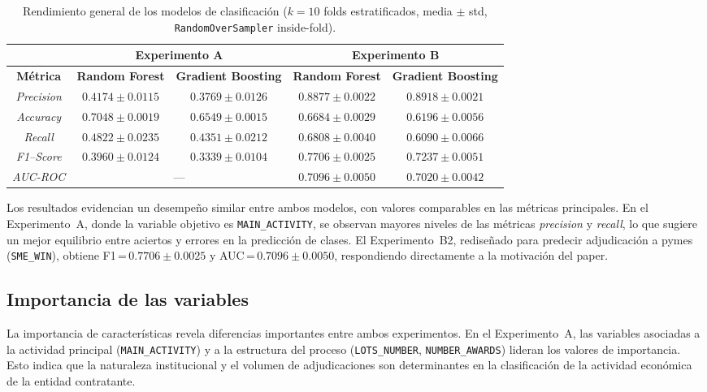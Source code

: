 \documentclass[a4paper,fleqn]{cas-sc}
\begin{document}
 \begin{table}[htb]
 	\small
 	\centering
 	\caption{Rendimiento general de los modelos de clasificación ($k=10$ folds estratificados, media $\pm$ std, \texttt{RandomOverSampler} inside-fold).}
 	\label{tab:metricas_ga_gb} 	
 	\setlength{\tabcolsep}{7pt} 	
	\renewcommand{\arraystretch}{1.3} %
 	\begin{tabular}{ccccc}
 		\hline
 		& \multicolumn{2}{c}{\textbf{Experimento A}} & \multicolumn{2}{c}{\textbf{Experimento B}} \\ \hline
 		\textbf{Métrica} & \textbf{Random Forest} & \textbf{Gradient Boosting} & \textbf{Random Forest} & \textbf{Gradient Boosting} \\ \hline
 		\textit{Precision} & $0.4174 \pm 0.0115$ & $0.3769 \pm 0.0126$ & $0.8877 \pm 0.0022$ & $0.8918 \pm 0.0021$ \\
\textit{Accuracy}  & $0.7048 \pm 0.0019$ & $0.6549 \pm 0.0015$ & $0.6684 \pm 0.0029$ & $0.6196 \pm 0.0056$ \\
\textit{Recall}    & $0.4822 \pm 0.0235$ & $0.4351 \pm 0.0212$ & $0.6808 \pm 0.0040$ & $0.6090 \pm 0.0066$ \\
\textit{F1--Score} & $0.3960 \pm 0.0124$ & $0.3339 \pm 0.0104$ & $0.7706 \pm 0.0025$ & $0.7237 \pm 0.0051$ \\
\textit{AUC-ROC}   & \multicolumn{2}{c}{---} & $0.7096 \pm 0.0050$ & $0.7020 \pm 0.0042$ \\ \hline
 	\end{tabular}
 \end{table}
 
 	Los resultados evidencian un desempeño similar entre ambos modelos, con valores comparables en las métricas principales. 
 	En el Experimento~A, donde la variable objetivo es \linebreak\texttt{MAIN\_ACTIVITY},  se observan mayores niveles de las métricas \textit{precision} y \textit{recall}, lo que sugiere un mejor equilibrio entre aciertos y errores en la predicción de clases. 
 	El Experimento~B2, rediseñado para predecir adjudicación a pymes (\texttt{SME\_WIN}), obtiene F1\,=\,$0.7706 \pm 0.0025$ y AUC\,=\,$0.7096 \pm 0.0050$, respondiendo directamente a la motivación del paper.
 
 
 \subsection{Importancia de las variables}

 	La importancia de características revela diferencias importantes entre ambos experimentos. En el Experimento~A, las variables asociadas a la actividad principal (\texttt{MAIN\_ACTIVITY}) y a la estructura del proceso (\texttt{LOTS\_NUMBER}, \texttt{NUMBER\_AWARDS}) lideran los valores de importancia. Esto indica que la naturaleza institucional y el volumen de adjudicaciones son determinantes en la clasificación de la actividad económica de la entidad contratante.
 	
\end{document}
